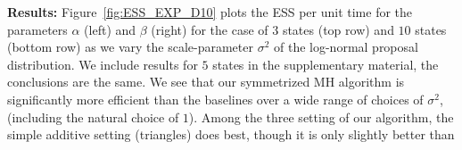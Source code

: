 \noindent \textbf{Results:}
  Figure~\ref{fig:ESS_EXP_D10} plots the ESS per unit time for the parameters 
  $\alpha$ (left) and $\beta$ (right) for the
  case of $3$ states (top row) and $10$ states (bottom row) as we vary the scale-parameter $\sigma^2$ of the
  log-normal proposal distribution. We include results for $5$ states in the 
  supplementary material, the conclusions are the same. 
We see that our symmetrized MH algorithm is significantly more efficient 
than the baselines over a wide range of choices of $\sigma^2$, 
(including the natural choice of $1$).
Among the three setting of our algorithm, the simple additive setting
 ({triangles}) does best, though it is only slightly better than 
